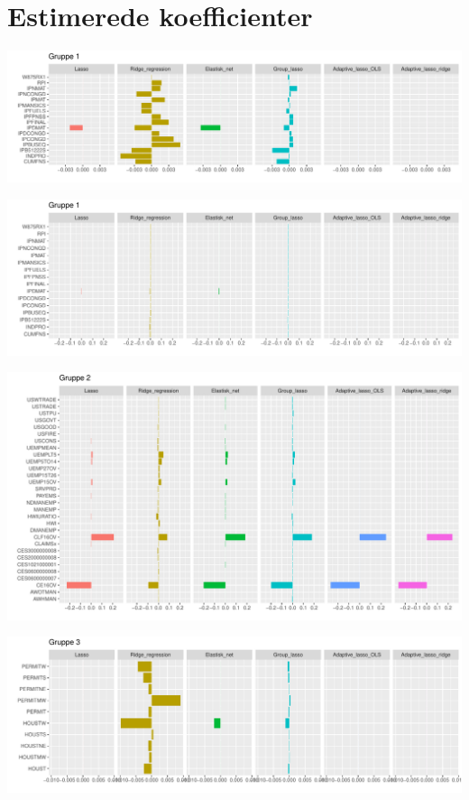 \chapter{Estimerede koefficienter}

\begin{landscape}
\includegraphics[scale=0.75]{fig/img/coef_group1.pdf}
\end{landscape}

\begin{landscape}
\includegraphics[scale=0.75]{fig/img/coef_group11.pdf}
\end{landscape}

\begin{landscape}
\includegraphics[scale=0.75]{fig/img/coef_group2.pdf}
\end{landscape}

\begin{landscape}
\includegraphics[scale=0.75]{fig/img/coef_group3.pdf}
\end{landscape}


